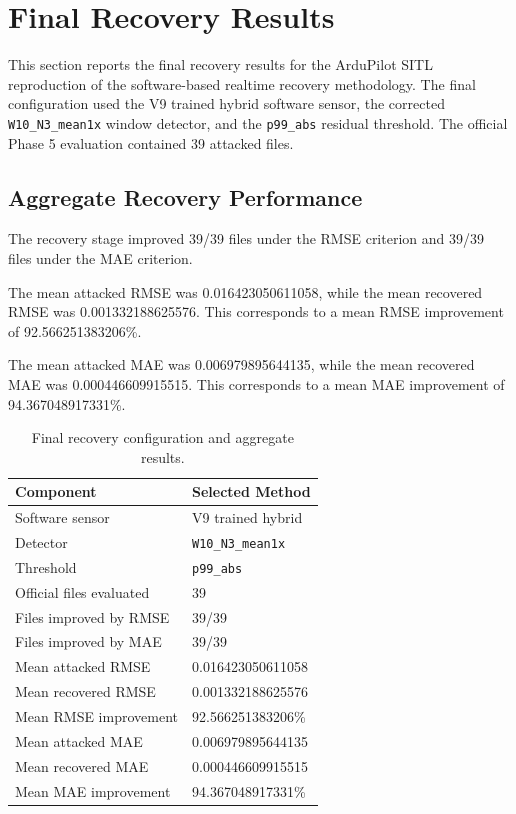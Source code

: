 \section{Final Recovery Results}

This section reports the final recovery results for the ArduPilot SITL reproduction of the software-based realtime recovery methodology. The final configuration used the V9 trained hybrid software sensor, the corrected \texttt{W10\_N3\_mean1x} window detector, and the \texttt{p99\_abs} residual threshold. The official Phase 5 evaluation contained 39 attacked files.

\subsection{Aggregate Recovery Performance}

The recovery stage improved 39/39 files under the RMSE criterion and 39/39 files under the MAE criterion.

The mean attacked RMSE was 0.016423050611058, while the mean recovered RMSE was 0.001332188625576. This corresponds to a mean RMSE improvement of 92.566251383206\%.

The mean attacked MAE was 0.006979895644135, while the mean recovered MAE was 0.000446609915515. This corresponds to a mean MAE improvement of 94.367048917331\%.

\begin{table}[t]
\centering
\caption{Final recovery configuration and aggregate results.}
\label{tab:final_recovery_results}
\begin{tabular}{ll}
\hline
Component & Selected Method \\
\hline
Software sensor & V9 trained hybrid \\
Detector & \texttt{W10\_N3\_mean1x} \\
Threshold & \texttt{p99\_abs} \\
Official files evaluated & 39 \\
Files improved by RMSE & 39/39 \\
Files improved by MAE & 39/39 \\
Mean attacked RMSE & 0.016423050611058 \\
Mean recovered RMSE & 0.001332188625576 \\
Mean RMSE improvement & 92.566251383206\% \\
Mean attacked MAE & 0.006979895644135 \\
Mean recovered MAE & 0.000446609915515 \\
Mean MAE improvement & 94.367048917331\% \\
\hline
\end{tabular}
\end{table}


